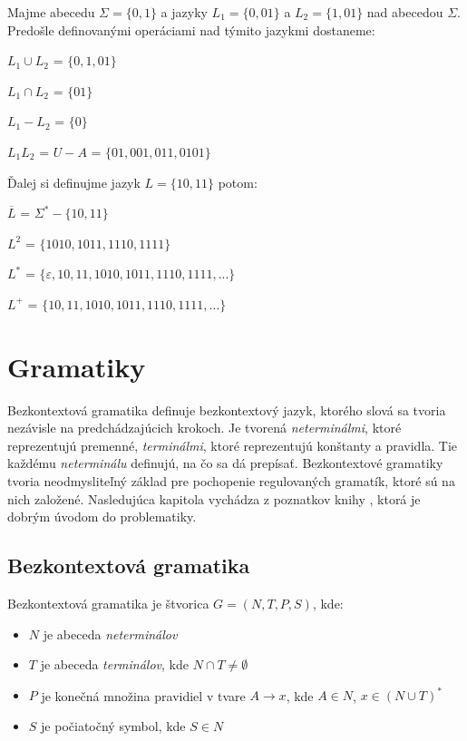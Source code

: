 \begin{theorem}
\normalfont Majme abecedu $\Sigma = \{0, 1\}$ a jazyky $L_1 = \{0, 01\}$ a $L_2 = \{1, 01\}$ nad abecedou $\Sigma$. Predošle definovanými operáciami nad týmito jazykmi dostaneme:
\begin{center}
\item $L_1 \cup L_2$ = $\{0, 1, 01\}$
\item $L_1 \cap L_2$ = $\{01\}$
\item $L_1 - L_2$ = $\{0\}$
\item $L_1L_2$ = $U - A$ = $\{01, 001, 011, 0101\}$
\end{center} 

Ďalej si definujme jazyk $L = \{10, 11\}$ potom:
\begin{center}
\item $\overline{L}$ = $\Sigma^\ast - \{10, 11\}$
\item $L^2$ = $\{1010, 1011, 1110, 1111\}$
\item $L^\ast$ = $\{\varepsilon, 10, 11, 1010, 1011, 1110, 1111, ...\}$
\item $L^+$ = $\{10, 11, 1010, 1011, 1110, 1111, ...\}$
\end{center} 

\end{theorem}

\chapter{Gramatiky}

Bezkontextová gramatika definuje bezkontextový jazyk, ktorého slová sa tvoria nezávisle na predchádzajúcich krokoch. Je tvorená \textit{neterminálmi},  ktoré reprezentujú premenné, \textit{terminálmi}, ktoré reprezentujú konštanty a pravidla. Tie každému \textit{neterminálu} definujú, na čo sa dá prepísať. Bezkontextové gramatiky tvoria neodmysliteľný základ pre pochopenie regulovaných gramatík, ktoré sú na nich založené. Nasledujúca kapitola vychádza z poznatkov knihy \cite{Automata}, ktorá je dobrým úvodom do problematiky. 



\section{Bezkontextová gramatika}
\label{gramatika}

Bezkontextová gramatika je štvorica $G = (N, T, P, S)$, kde:
\begin{itemize}
\item $N$ je abeceda \textit{neterminálov}
\item $T$ je abeceda \textit{terminálov}, kde $N \cap T \neq \emptyset$
\item $P$ je konečná množina pravidiel v tvare $A \to x$, kde $A \in N$, $x \in (N \cup T)^\ast$
\item $S$ je počiatočný symbol, kde $S \in N$ 
\end{itemize} 


